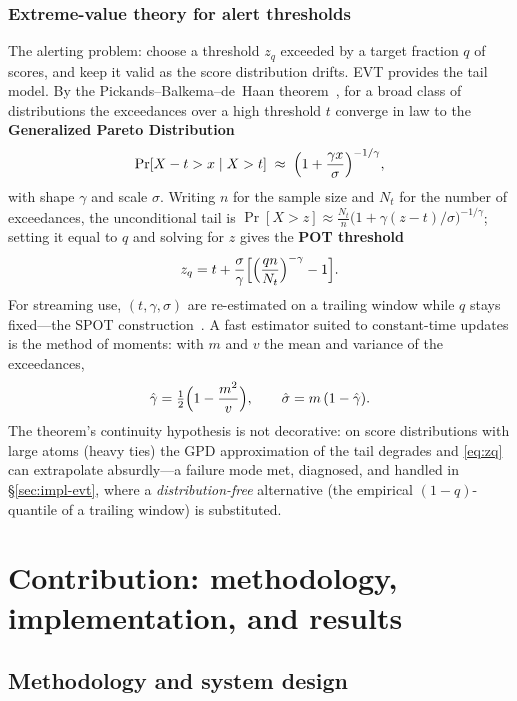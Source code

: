 \documentclass[11pt,a4paper]{report}
\newcommand{\keyword}[1]{\textbf{\color{accent2}#1}}
\begin{document}
\section{Extreme-value theory for alert thresholds}
\label{sec:theory-evt}
The alerting problem: choose a threshold $z_q$ exceeded by a target
fraction $q$ of scores, and keep it valid as the score distribution
drifts. EVT provides the tail model. By the Pickands--Balkema--de~Haan
theorem~\cite{pickands,coles}, for a broad class of distributions the
exceedances over a high threshold $t$ converge in law to the
\keyword{Generalized Pareto Distribution}
\[
\Pr[X-t>x\mid X>t]\;\approx\;\Bigl(1+\frac{\gamma x}{\sigma}\Bigr)^{-1/\gamma},
\]
with shape $\gamma$ and scale $\sigma$. Writing $n$ for the sample size and
$N_t$ for the number of exceedances, the unconditional tail is
$\Pr[X>z]\approx\frac{N_t}{n}\bigl(1+\gamma(z-t)/\sigma\bigr)^{-1/\gamma}$;
setting it equal to $q$ and solving for $z$ gives the \keyword{POT
threshold}
\begin{equation}
z_q=t+\frac{\sigma}{\gamma}\Bigl[\Bigl(\frac{qn}{N_t}\Bigr)^{-\gamma}-1\Bigr].
\label{eq:zq}
\end{equation}
For streaming use, $(t,\gamma,\sigma)$ are re-estimated on a trailing
window while $q$ stays fixed---the SPOT construction~\cite{spot}. A fast
estimator suited to constant-time updates is the method of moments: with
$m$ and $v$ the mean and variance of the exceedances,
\[
\hat\gamma=\tfrac12\Bigl(1-\frac{m^2}{v}\Bigr),\qquad
\hat\sigma=m\,(1-\hat\gamma).
\]
The theorem's continuity hypothesis is not decorative: on score
distributions with large atoms (heavy ties) the GPD approximation of the
tail degrades and \eqref{eq:zq} can extrapolate absurdly---a failure mode
met, diagnosed, and handled in \S\ref{sec:impl-evt}, where a
\emph{distribution-free} alternative (the empirical $(1{-}q)$-quantile of a
trailing window) is substituted.

\part{Contribution: methodology, implementation, and results}

\chapter{Methodology and system design}
\label{ch:methodology}
\end{document}
